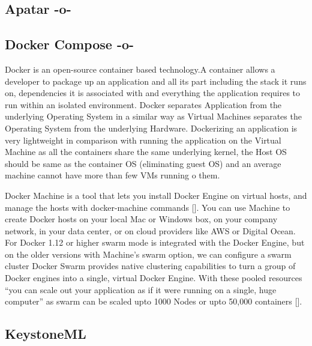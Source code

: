 \subsection{Apatar -o-}



\subsection{Docker Compose -o-}

Docker is an open-source container based technology.A container allows
a developer to package up an application and all its part including
the stack it runs on, dependencies it is associated with and
everything the application requires to run within an isolated
environment. Docker separates Application from the underlying
Operating System in a similar way as Virtual Machines separates the
Operating System from the underlying Hardware. Dockerizing an
application is very lightweight in comparison with running the
application on the Virtual Machine as all the containers share the
same underlying kernel, the Host OS should be same as the container OS
(eliminating guest OS) and an average machine cannot have more than
few VMs running o them.

Docker Machine is a tool that lets you install Docker Engine on
virtual hosts, and manage the hosts with docker-machine commands
[\cite{docker-book}]. You can use Machine to create Docker hosts on
your local Mac or Windows box, on your company network, in your data
center, or on cloud providers like AWS or Digital Ocean. For Docker
1.12 or higher swarm mode is integrated with the Docker Engine, but on
the older versions with Machine's swarm option, we can configure a
swarm cluster Docker Swarm provides native clustering capabilities to
turn a group of Docker engines into a single, virtual Docker
Engine. With these pooled resources ``you can scale out your
application as if it were running on a single, huge computer'' as
swarm can be scaled upto 1000 Nodes or upto 50,000 containers
[\cite{www-docker}].


    
\subsection{KeystoneML}
    

